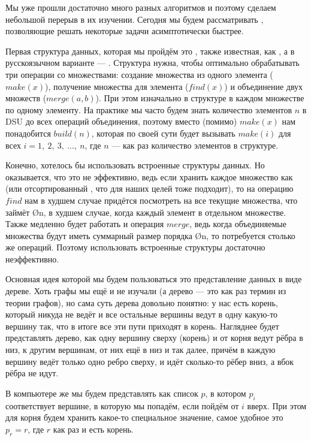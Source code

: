 Мы уже прошли достаточно много разных алгоритмов и поэтому сделаем небольшой перерыв в их изучении. Сегодня мы будем рассматривать , позволяющие решать некоторые задачи асимптотически быстрее.


Первая структура данных, которая мы пройдём это , также известная, как , а в русскоязычном варианте — . Структура нужна, чтобы оптимально обрабатывать три операции со множествами: создание множества из одного элемента ($make(x)$), получение множества для элемента ($find(x)$) и объединение двух множеств ($merge(a, b)$). При этом изначально в структуре в каждом множестве по одному элементу. На практике мы часто будем знать количество элементов $n$ в DSU до всех операций объединения, поэтому вместо (помимо) $make(x)$ нам понадобится $build(n)$, которая по своей сути будет вызывать $make(i)$ для всех $i = 1,\ 2,\ 3,\ \ldots,\ n$, где $n$ — как раз количество элементов в структуре.

Конечно, хотелось бы использовать встроенные структуры данных. Но оказывается, что это не эффективно, ведь если хранить каждое множество как  (или отсортированный , что для наших целей тоже подходит), то на операцию $find$ нам в худшем случае придётся посмотреть на все текущие множества, что займёт \O{n}, в худшем случае, когда каждый элемент в отдельном множестве. Также медленно будет работать и операция $merge$, ведь когда объединяемые множества будут иметь суммарный размер порядка \O{n}, то потребуется столько же операций. Поэтому использовать встроенные структуры достаточно неэффективно.

Основная идея которой мы будем пользоваться это представление данных в виде дереве. Хоть графы мы ещё и не изучали (а дерево — это как раз термин из теории графов), но сама суть дерева довольно понятно: у нас есть корень, который никуда не ведёт и все остальные вершины ведут в одну какую-то вершину так, что в итоге все эти пути приходят в корень. Нагляднее будет представлять дерево, как одну вершину сверху (корень) и от корня ведут рёбра в низ, к другим вершинам, от них ещё в низ и так далее, причём в каждую вершину ведёт только одно ребро сверху, и идёт сколько-то рёбер вниз, а вбок рёбра не идут.

В компьютере же мы будем представлять как список $p$, в котором $p_i$ соответствует вершине, в которую мы попадём, если пойдём от $i$ вверх. При этом для корня будем хранить какое-то специальное значение, самое удобное это $p_r = r$, где $r$ как раз и есть корень.

